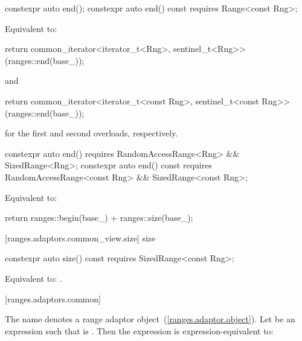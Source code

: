 %
\begin{itemdecl}
constexpr auto end();
constexpr auto end() const requires Range<const Rng>;
\end{itemdecl}

\begin{itemdescr}
\pnum
\effects Equivalent to:
\begin{codeblock}
return common_iterator<iterator_t<Rng>, sentinel_t<Rng>>(ranges::end(base_));
\end{codeblock}
and
\begin{codeblock}
return common_iterator<iterator_t<const Rng>, sentinel_t<const Rng>>(ranges::end(base_));
\end{codeblock}
for the first and second overloads, respectively.
\end{itemdescr}

%
\begin{itemdecl}
constexpr auto end()
  requires RandomAccessRange<Rng> && SizedRange<Rng>;
constexpr auto end() const
  requires RandomAccessRange<const Rng> && SizedRange<const Rng>;
\end{itemdecl}

\begin{itemdescr}
\pnum
\effects Equivalent to:
\begin{codeblock}
return ranges::begin(base_) + ranges::size(base_);
\end{codeblock}
\end{itemdescr}

[ranges.adaptors.common_view.size]{ size}

%
\begin{itemdecl}
constexpr auto size() const requires SizedRange<const Rng>;
\end{itemdecl}

\begin{itemdescr}
\pnum
\effects Equivalent to: .
\end{itemdescr}

[ranges.adaptors.common]{}

\pnum
The name  denotes a range adaptor
object~(\ref{ranges.adaptor.object}).
Let  be an expression such that  is .
Then the expression  is
expression-equivalent to:

